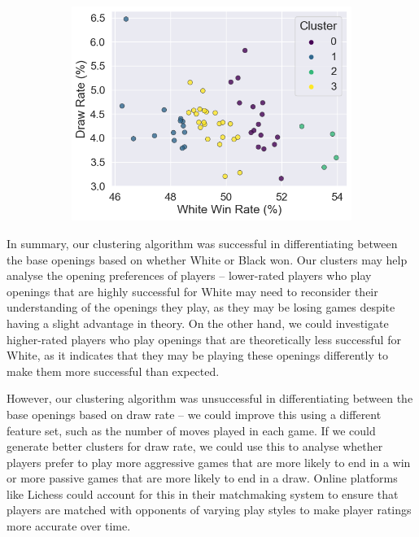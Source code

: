 \documentclass[a4paper, 11pt]{article}
\begin{document}
\begin{figure}[H]
\begin{subfigure}{0.49\textwidth}
        \includegraphics[width=\textwidth]{Base Openings Clustered by Game Results (White Win Rate vs Draw Rate).png}
    \end{subfigure}
\end{figure}

In summary, our clustering algorithm was successful in differentiating between the base openings based on whether White or Black won. Our clusters may help analyse the opening preferences of players -- lower-rated players who play openings that are highly successful for White may need to reconsider their understanding of the openings they play, as they may be losing games despite having a slight advantage in theory. On the other hand, we could investigate higher-rated players who play openings that are theoretically less successful for White, as it indicates that they may be playing these openings differently to make them more successful than expected.

However, our clustering algorithm was unsuccessful in differentiating between the base openings based on draw rate -- we could improve this using a different feature set, such as the number of moves played in each game. If we could generate better clusters for draw rate, we could use this to analyse whether players prefer to play more aggressive games that are more likely to end in a win or more passive games that are more likely to end in a draw. Online platforms like Lichess could account for this in their matchmaking system to ensure that players are matched with opponents of varying play styles to make player ratings more accurate over time.
\end{document}
